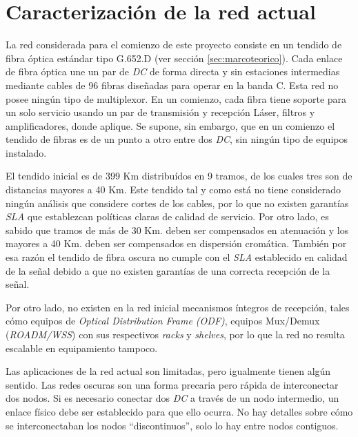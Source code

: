 \section{Caracterización de la red actual}
\label{sec:caracterizacion}

La red considerada para el comienzo de este proyecto consiste en un
tendido de fibra óptica estándar tipo G.652.D (ver sección
\ref{sec:marcoteorico}). Cada enlace de fibra óptica une un par de
\emph{DC} de forma directa y sin estaciones intermedias mediante
cables de 96 fibras diseñadas para operar en la banda C. Esta red no
posee ningún tipo de multiplexor. En un comienzo, cada fibra tiene
soporte para un solo servicio usando un par de transmisión y recepción
Láser, filtros y amplificadores, donde aplique. Se supone, sin
embargo, que en un comienzo el tendido de fibras es de un punto a otro
entre dos \emph{DC}, sin ningún tipo de equipos instalado.

El tendido inicial es de 399 Km distribuídos en 9 tramos, de los
cuales tres son de distancias mayores a 40 Km. Este tendido tal y como
está no tiene considerado ningún análisis que considere cortes de los
cables, por lo que no existen garantías \emph{SLA} que establezcan
políticas claras de calidad de servicio. Por otro lado, es sabido que
tramos de más de 30 Km. deben ser compensados en atenuación y los
mayores a 40 Km. deben ser compensados en dispersión
cromática. También por esa razón el tendido de fibra oscura no cumple
con el \emph{SLA} establecido en calidad de la señal debido a que no
existen garantías de una correcta recepción de la señal.

Por otro lado, no existen en la red inicial mecanismos íntegros de
recepción, tales cómo equipos de \textit{Optical Distribution Frame
  (ODF)}, equipos Mux/Demux (\textit{ROADM/WSS}) con sus respectivos
\textit{racks} y \textit{shelves}, por lo que la red no resulta
escalable en equipamiento tampoco.

Las aplicaciones de la red actual son limitadas, pero igualmente
tienen algún sentido. Las redes oscuras son una forma precaria pero
rápida de interconectar dos nodos. Si es necesario conectar dos
\emph{DC} a través de un nodo intermedio, un enlace físico debe ser
establecido para que ello ocurra. No hay detalles sobre cómo se
interconectaban los nodos ``discontinuos'', solo lo hay entre nodos
contiguos.

